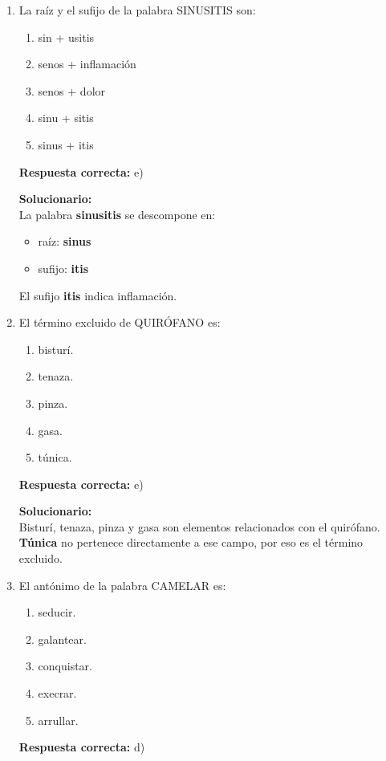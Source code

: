 \begin{enumerate}
	
	
	\item La raíz y el sufijo de la palabra SINUSITIS son:
	\begin{enumerate}[label=\alph*)]
		\item sin + usitis
		\item senos + inflamación
		\item senos + dolor
		\item sinu + sitis
		\item sinus + itis
	\end{enumerate}
	\textbf{Respuesta correcta:} e)
	
	\vspace{2mm}
	\textbf{Solucionario:}\\
	La palabra \textbf{sinusitis} se descompone en:
	\begin{itemize}
		\item raíz: \textbf{sinus}
		\item sufijo: \textbf{itis}
	\end{itemize}
	
	El sufijo \textbf{itis} indica inflamación.
	
	\vspace{6mm}
	
	\item El término excluido de QUIRÓFANO es:
	\begin{enumerate}[label=\alph*)]
		\item bisturí.
		\item tenaza.
		\item pinza.
		\item gasa.
		\item túnica.
	\end{enumerate}
	\textbf{Respuesta correcta:} e)
	
	\vspace{2mm}
	\textbf{Solucionario:}\\
	Bisturí, tenaza, pinza y gasa son elementos relacionados con el quirófano.  
	\textbf{Túnica} no pertenece directamente a ese campo, por eso es el término excluido.
	
	\vspace{6mm}
	
	\item El antónimo de la palabra CAMELAR es:
	\begin{enumerate}[label=\alph*)]
		\item seducir.
		\item galantear.
		\item conquistar.
		\item execrar.
		\item arrullar.
	\end{enumerate}
	\textbf{Respuesta correcta:} d)
	

\end{enumerate}
